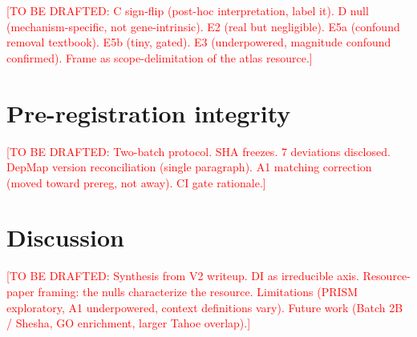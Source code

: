 \documentclass[11pt]{article}
\begin{document}
\textcolor{red}{[TO BE DRAFTED: C sign-flip (post-hoc interpretation, label it). D null (mechanism-specific, not gene-intrinsic). E2 (real but negligible). E5a (confound removal textbook). E5b (tiny, gated). E3 (underpowered, magnitude confound confirmed). Frame as scope-delimitation of the atlas resource.]}

\section{Pre-registration integrity}
\label{sec:integrity}

\textcolor{red}{[TO BE DRAFTED: Two-batch protocol. SHA freezes. 7 deviations disclosed. DepMap version reconciliation (single paragraph). A1 matching correction (moved toward prereg, not away). CI gate rationale.]}

\section{Discussion}
\label{sec:discussion}

\textcolor{red}{[TO BE DRAFTED: Synthesis from V2 writeup. DI as irreducible axis. Resource-paper framing: the nulls characterize the resource. Limitations (PRISM exploratory, A1 underpowered, context definitions vary). Future work (Batch 2B / Shesha, GO enrichment, larger Tahoe overlap).]}


\end{document}
